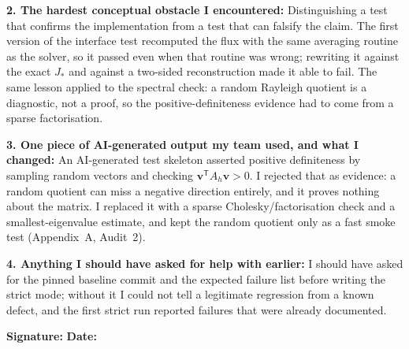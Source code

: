 \begin{formbox}
\textbf{2. The hardest conceptual obstacle I encountered:}
Distinguishing a test that confirms the implementation from a test that can
falsify the claim. The first version of the interface test recomputed the flux
with the same averaging routine as the solver, so it passed even when that
routine was wrong; rewriting it against the exact $J_*$ and against a
two-sided reconstruction made it able to fail. The same lesson applied to the
spectral check: a random Rayleigh quotient is a diagnostic, not a proof, so the
positive-definiteness evidence had to come from a sparse factorisation.

\textbf{3. One piece of AI-generated output my team used, and what I changed:}
An AI-generated test skeleton asserted positive definiteness by sampling random
vectors and checking $\bm v^{\mathsf T}A_h\bm v>0$. I rejected that as
evidence: a random quotient can miss a negative direction entirely, and it
proves nothing about the matrix. I replaced it with a sparse
Cholesky/factorisation check and a smallest-eigenvalue estimate, and kept the
random quotient only as a fast smoke test (Appendix~A, Audit~2).

\textbf{4. Anything I should have asked for help with earlier:}
I should have asked for the pinned baseline commit and the expected failure list
before writing the strict mode; without it I could not tell a legitimate
regression from a known defect, and the first strict run reported failures that
were already documented.

\textbf{Signature:} \underline{\hspace{4.2cm}} \hfill
\textbf{Date:} \underline{\hspace{2.2cm}}
\end{formbox}
